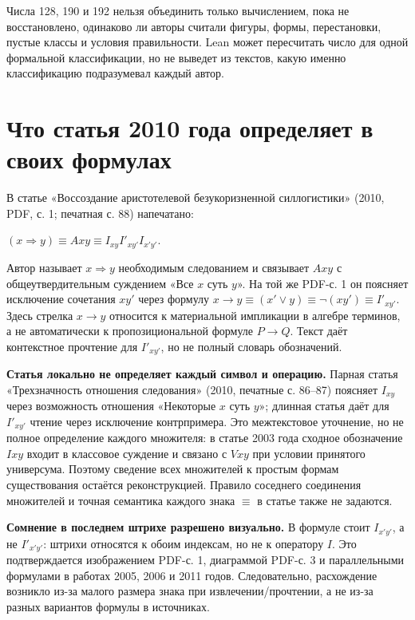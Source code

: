 \documentclass[12pt,a4paper]{article}
\begin{document}
Числа 128, 190 и 192 нельзя объединить только вычислением, пока не восстановлено, одинаково ли авторы считали фигуры, формы, перестановки, пустые классы и условия правильности. Lean может пересчитать число для одной формальной классификации, но не выведет из текстов, какую именно классификацию подразумевал каждый автор.

\section{Что статья 2010 года определяет в своих формулах}

В статье «Воссоздание аристотелевой безукоризненной силлогистики» (2010, PDF, с. 1; печатная с. 88) напечатано:

\( (x\Rightarrow y) \equiv Axy \equiv I_{xy} I'_{xy'} I_{x'y'}. \)

Автор называет \(x\Rightarrow y\) необходимым следованием и связывает \(Axy\) с общеутвердительным суждением «Все \(x\) суть \(y\)». На той же PDF-с. 1 он поясняет исключение сочетания \(xy'\) через формулу \(x\to y \equiv (x'\lor y) \equiv \neg(xy') \equiv I'_{xy'}\). Здесь стрелка \(x\to y\) относится к материальной импликации в алгебре терминов, а не автоматически к пропозициональной формуле \(P\to Q\). Текст даёт контекстное прочтение для \(I'_{xy'}\), но не полный словарь обозначений.

\textbf{Статья локально не определяет каждый символ и операцию.} Парная статья «Трехзначность отношения следования» (2010, печатные с. 86–87) поясняет \(I_{xy}\) через возможность отношения «Некоторые \(x\) суть \(y\)»; длинная статья даёт для \(I'_{xy'}\) чтение через исключение контрпримера. Это межтекстовое уточнение, но не полное определение каждого множителя: в статье 2003 года сходное обозначение \(Ixy\) входит в классовое суждение и связано с \(Vxy\) при условии принятого универсума. Поэтому сведение всех множителей к простым формам существования остаётся реконструкцией. Правило соседнего соединения множителей и точная семантика каждого знака \(\equiv\) в статье также не задаются.

\textbf{Сомнение в последнем штрихе разрешено визуально.} В формуле стоит \(I_{x'y'}\), а не \(I'_{x'y'}\): штрихи относятся к обоим индексам, но не к оператору \(I\). Это подтверждается изображением PDF-с. 1, диаграммой PDF-с. 3 и параллельными формулами в работах 2005, 2006 и 2011 годов. Следовательно, расхождение возникло из-за малого размера знака при извлечении/прочтении, а не из-за разных вариантов формулы в источниках.
\end{document}
